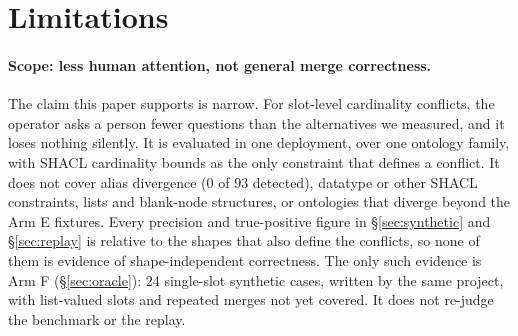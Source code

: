 \section{Limitations}
\label{sec:limits}

\paragraph{Scope: less human attention, not general merge correctness.} The
claim this paper supports is narrow. For slot-level cardinality conflicts, the
operator asks a person fewer questions than the alternatives we measured, and it
loses nothing silently. It is evaluated in one deployment, over one ontology
family, with SHACL cardinality bounds as the only constraint that defines a
conflict. It does not cover alias divergence ($0$ of $93$ detected), datatype or
other SHACL constraints, lists and blank-node structures, or ontologies that
diverge beyond the Arm E fixtures. Every precision and true-positive figure in
\S\ref{sec:synthetic} and \S\ref{sec:replay} is relative to the shapes that also
define the conflicts, so none of them is evidence of shape-independent
correctness. The only such evidence is Arm F (\S\ref{sec:oracle}): $24$
single-slot synthetic cases, written by the same project, with list-valued
slots and repeated merges not yet covered. It does not re-judge the benchmark
or the replay.

